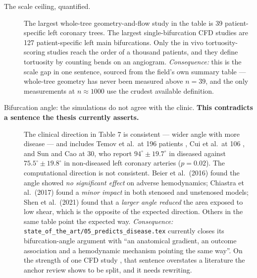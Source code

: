 \begin{description}

\item[The scale ceiling, quantified.]
The largest whole-tree geometry-and-flow study in the table is 39 patient-specific left coronary
trees. The largest single-bifurcation CFD studies are 127 patient-specific left main bifurcations.
Only the in vivo tortuosity-scoring studies reach the order of a thousand patients, and they define
tortuosity by counting bends on an angiogram.
\textit{Consequence:} this is the scale gap in one sentence, sourced from the field's own summary
table --- whole-tree geometry has never been measured above $n = 39$, and the only measurements at
$n \approx 1000$ use the crudest available definition.

\item[Bifurcation angle: the simulations do not agree with the clinic. \textbf{This contradicts a
sentence the thesis currently asserts.}]
The clinical direction in Table 7 is consistent --- wider angle with more disease --- and includes
Temov et al.\ at 196 patients \cite{temov2016bifurcation}, Cui et al.\ at 106
\cite{cui2017bifurcation}, and Sun and Cao at 30, who report $94^\circ \pm 19.7^\circ$ in diseased
against $75.5^\circ \pm 19.8^\circ$ in non-diseased left coronary arteries ($p = 0.02$).
The computational direction is not consistent. Beier et al.\ (2016) found the angle showed
\emph{no significant effect} on adverse hemodynamics; Chiastra et al.\ (2017) found a
\emph{minor impact} in both stenosed and unstenosed models; Shen et al.\ (2021) found that a
\emph{larger angle reduced} the area exposed to low shear, which is the opposite of the expected
direction. Others in the same table point the expected way.
\textit{Consequence:} \texttt{state\_of\_the\_art/05\_predicts\_disease.tex} currently closes its
bifurcation-angle argument with ``an anatomical gradient, an outcome association and a hemodynamic
mechanism pointing the same way''. On the strength of one CFD study
\cite{wang2024lmphenotypes}, that sentence overstates a literature the anchor review shows to be
split, and it needs rewriting.


\end{description}
